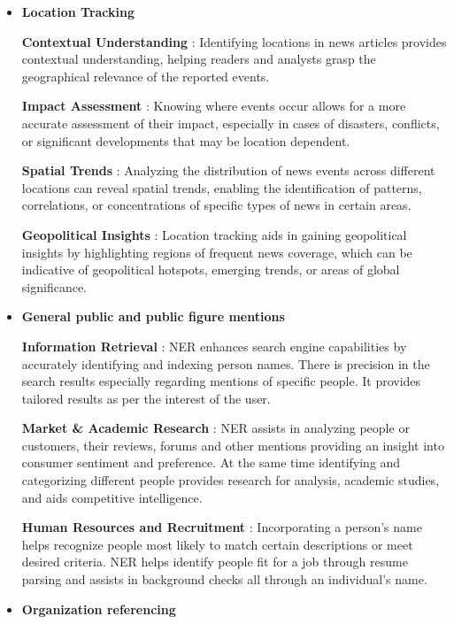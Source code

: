 \begin{itemize}
\item  \textbf{Location Tracking}

\textbf{Contextual Understanding} : Identifying locations in news articles provides contextual understanding, helping readers and analysts grasp the geographical relevance of the reported events.


\textbf{Impact Assessment} : Knowing where events occur allows for a more accurate assessment of their impact, especially in cases of disasters, conflicts, or significant developments that may be location dependent.

\textbf{Spatial Trends} : Analyzing the distribution of news events across different locations can reveal spatial trends, enabling the identification of patterns, correlations, or concentrations of specific types of news in certain areas.

\textbf{Geopolitical Insights} : Location tracking aids in gaining geopolitical insights by highlighting regions of frequent news coverage, which can be indicative of geopolitical hotspots, emerging trends, or areas of global significance.

\item \textbf{General public and public figure mentions}
\vspace{10pt} %

\textbf{Information Retrieval} : NER enhances search engine capabilities by accurately identifying and indexing person names. There is precision in the search results especially regarding mentions of specific people. It provides tailored results as per the interest of the user.

\textbf{Market \& Academic Research} : NER assists in analyzing people or customers,   their reviews, forums and other mentions providing an insight into consumer sentiment and preference. At the same time identifying and categorizing different people provides research for analysis, academic studies, and aids competitive intelligence.

\textbf{Human Resources and Recruitment} : Incorporating a person’s name helps recognize people most likely to match certain descriptions or meet desired criteria. NER helps identify people fit for a job through resume parsing and assists in background checks all through an individual's name.\\

\item \textbf{Organization referencing}
\vspace{10pt} %


\end{itemize}
